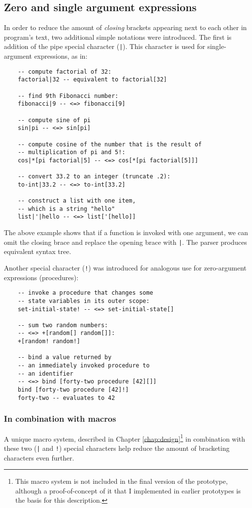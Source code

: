 \subsection{Zero and single argument expressions}
In order to reduce the amount of \textit{closing} brackets appearing next to each other in program's text, two additional simple notations were introduced. The first is addition of the pipe special character (\texttt{|}). This character is used for single-argument expressions, as in:
\begin{lstlisting}
    -- compute factorial of 32:
    factorial|32 -- equivalent to factorial[32]
    
    -- find 9th Fibonacci number:
    fibonacci|9 -- <=> fibonacci[9]
    
    -- compute sine of pi
    sin|pi -- <=> sin[pi]
    
    -- compute cosine of the number that is the result of
    -- multiplication of pi and 5!:
    cos|*[pi factorial|5] -- <=> cos[*[pi factorial[5]]]
    
    -- convert 33.2 to an integer (truncate .2):
    to-int|33.2 -- <=> to-int[33.2]
    
    -- construct a list with one item,
    -- which is a string "hello"
    list|'|hello -- <=> list['[hello]]
\end{lstlisting}

The above example shows that if a function is invoked with one argument, we can omit the closing brace and replace the opening brace with \texttt{|}. The parser produces equivalent syntax tree.

Another special character (\texttt{!}) was introduced for analogous use for zero-argument expressions (procedures):
\begin{lstlisting}
    -- invoke a procedure that changes some
    -- state variables in its outer scope:
    set-initial-state! -- <=> set-initial-state[]
    
    -- sum two random numbers:
    -- <=> +[random[] random[]]:
    +[random! random!] 
    
    -- bind a value returned by
    -- an immediately invoked procedure to 
    -- an identifier
    -- <=> bind [forty-two procedure [42][]]
    bind [forty-two procedure [42]!] 
    forty-two -- evaluates to 42
\end{lstlisting}

\subsubsection{In combination with macros}\label{subsub:macros}
A unique macro system, described in Chapter \ref{chap:design}\footnote{This macro system is not included in the final version of the prototype, although a proof-of-concept of it that I implemented in earlier prototypes is the basis for this description.} in combination with these two (\texttt{|} and \texttt{!}) special characters help reduce the amount of bracketing characters even further.

